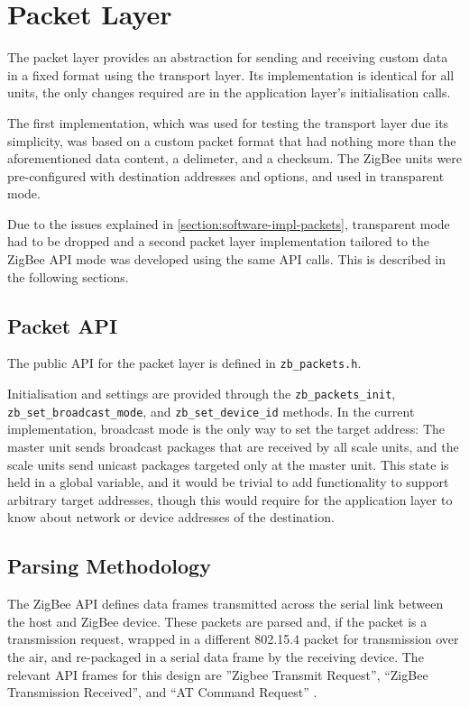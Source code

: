 \section{Packet Layer}
The packet layer provides an abstraction for sending and receiving custom data in a fixed format using the transport layer. Its implementation is identical for all units, the only changes required are in the application layer's initialisation calls.

The first implementation, which was used for testing the transport layer due its simplicity, was based on a custom packet format that had nothing more than the aforementioned data content, a delimeter, and a checksum. The ZigBee units were pre-configured with destination addresses and options, and used in transparent mode.

Due to the issues explained in \ref{section:software-impl-packets}, transparent mode had to be dropped and a second packet layer implementation tailored to the ZigBee API mode was developed using the same API calls. This is described in the following sections. 

\subsection{Packet API}
The public API for the packet layer is defined in \texttt{zb\_packets.h}. 

Initialisation and settings are provided through the \texttt{zb\_packets\_init}, \texttt{zb\_set\_broadcast\_mode}, and \texttt{zb\_set\_device\_id} methods. In the current implementation, broadcast mode is the only way to set the target address: The master unit sends broadcast packages that are received by all scale units, and the scale units send unicast packages targeted only at the master unit. This state is held in a global variable, and it would be trivial to add functionality to support arbitrary target addresses, though this would require for the application layer to know about network or device addresses of the destination.


\subsection{Parsing Methodology}
The ZigBee API defines data frames transmitted across the serial link between the host and ZigBee device. These packets are parsed and, if the packet is a transmission request, wrapped in a different 802.15.4 packet for transmission over the air, and re-packaged in a serial data frame by the receiving device. The relevant API frames for this design are ''Zigbee Transmit Request'', ``ZigBee Transmission Received'', and ``AT Command Request'' \cite[cf. section 6, API Operation]{xbee-datasheet}.

